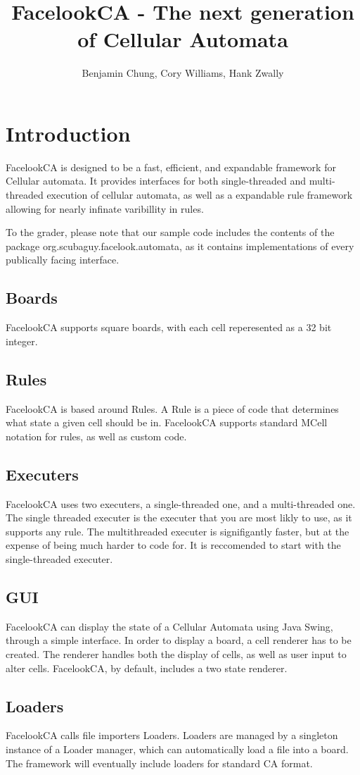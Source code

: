 \documentclass{report}
\title{FacelookCA - The next generation of Cellular Automata}
\author{Benjamin Chung, Cory Williams,
Hank Zwally}%
\begin{document}
\maketitle
\tableofcontents
\chapter{Introduction}
FacelookCA is designed to be a fast, efficient, and expandable framework for
Cellular automata. It provides interfaces for both single-threaded and
multi-threaded execution of cellular automata, as well as a expandable rule
framework allowing for nearly infinate varibillity in rules.


To the grader, please note that our sample code includes the contents of the
package org.scubaguy.facelook.automata, as it contains implementations of every
publically facing interface.
\section{Boards}
FacelookCA supports square boards, with each cell reperesented as a 32 bit
integer. 
\section{Rules}
FacelookCA is based around Rules. A Rule is a piece of code that determines what
state a given cell should be in. FacelookCA supports standard MCell notation for
rules, as well as custom code.
\section{Executers}
FacelookCA uses two executers, a single-threaded one, and a multi-threaded one.
The single threaded executer is the executer that you are most likly to use, as
it supports any rule. The multithreaded executer is signifigantly faster, but at
the expense of being much harder to code for. It is reccomended to start with
the single-threaded executer.
\section{GUI}
FacelookCA can display the state of a Cellular Automata using Java Swing,
through a simple interface. In order to display a board, a cell renderer has to be created. The
renderer handles both the display of cells, as well as user input to alter
cells. FacelookCA, by default, includes a two state renderer.
\section{Loaders}
FacelookCA calls file importers Loaders. Loaders are managed by a singleton
instance of a Loader manager, which can automatically load a file into a board.
The framework will eventually include loaders for standard CA format.
\end{document}
